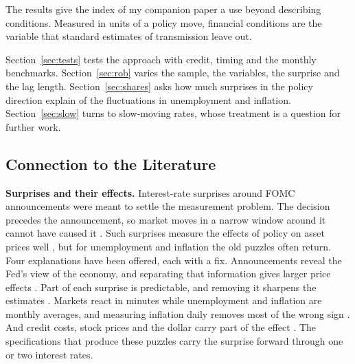 \documentclass[11pt]{article}
\begin{document}
The results give the index of my companion paper \citep{fcinote} a use beyond describing conditions. Measured in units of a policy move, financial conditions are the variable that standard estimates of transmission leave out.

Section~\ref{sec:tests} tests the approach with credit, timing and the monthly benchmarks. Section~\ref{sec:rob} varies the sample, the variables, the surprise and the lag length. Section~\ref{sec:shares} asks how much surprises in the policy direction explain of the fluctuations in unemployment and inflation. Section~\ref{sec:slow} turns to slow-moving rates, whose treatment is a question for further work.

\subsection{Connection to the Literature}
\textbf{Surprises and their effects.} Interest-rate surprises around FOMC announcements were meant to settle the measurement problem. The decision precedes the announcement, so market moves in a narrow window around it cannot have caused it \citep{kuttner2001,gurkaynak2005}. Such surprises measure the effects of policy on asset prices well \citep{bernanke2005,hanson2015,nakamura2018,swanson2021}, but for unemployment and inflation the old puzzles often return. Four explanations have been offered, each with a fix. Announcements reveal the Fed's view of the economy, and separating that information gives larger price effects \citep{romer2000,nakamura2018,jarocinski2020,miranda2021}. Part of each surprise is predictable, and removing it sharpens the estimates \citep{bauer2023,bauer2023aer}. Markets react in minutes while unemployment and inflation are monthly averages, and measuring inflation daily removes most of the wrong sign \citep{jacobson2026}. And credit costs, stock prices and the dollar carry part of the effect \citep{gertler2015,caldara2019,kroencke2021,bauer2023jep,boehm2024,bauer2026,boehm2026}. The specifications that produce these puzzles carry the surprise forward through one or two interest rates.
\end{document}
